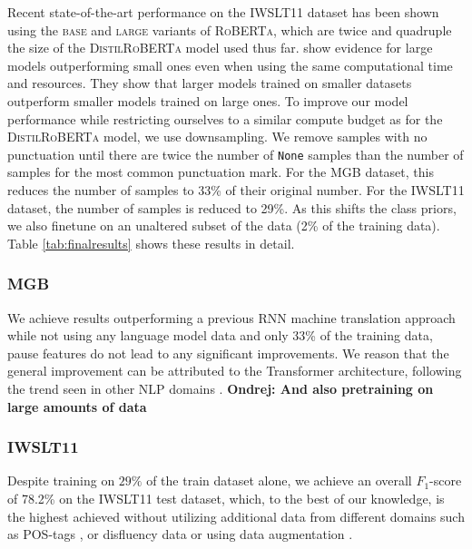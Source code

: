 \documentclass[bsc,deptreport,ai]{infthesis} %
\newcommand{\Ondrej}[1]{{\color{red} \textbf{Ondrej: #1}}}
\begin{document}
Recent state-of-the-art performance on the IWSLT11 dataset has been shown using the \textsc{base} and \textsc{large} variants of \textsc{RoBERTa}, which are twice and quadruple the size of the \textsc{DistilRoBERTa} model used thus far. \citet{li2020train} show evidence for large models outperforming small ones even when using the same computational time and resources. They show that larger models trained on smaller datasets outperform smaller models trained on large ones. To improve our model performance while restricting ourselves to a similar compute budget as for the \textsc{DistilRoBERTa} model, we use downsampling. We remove samples with no punctuation until there are twice the number of \texttt{None} samples than the number of samples for the most common punctuation mark. For the MGB dataset, this reduces the number of samples to 33\% of their original number. For the IWSLT11 dataset, the number of samples is reduced to 29\%. As this shifts the class priors, we also finetune on an unaltered subset of the data (2\% of the training data). Table \ref{tab:finalresults} shows these results in detail.
\subsubsection*{MGB}
We achieve results outperforming a previous RNN machine translation approach \citep{Klejch2016} while not using any language model data and only 33\% of the training data, pause features do not lead to any significant improvements. We reason that the general improvement can be attributed to the Transformer architecture, following the trend seen in other NLP domains \citep{transformersurvey}. \Ondrej{And also pretraining on large amounts of data}
\subsubsection*{IWSLT11}
Despite training on $29\%$ of the train dataset alone, we achieve an overall $F_1$-score of 78.2\% on the IWSLT11 test dataset, which, to the best of our knowledge, is the highest achieved without utilizing additional data from different domains such as POS-tags \citep{yi2020adversarial}, or disfluency data \citep{chen2020controllable,Lin2020disf} or using data augmentation \citep{sotapunctuation}.
\end{document}
